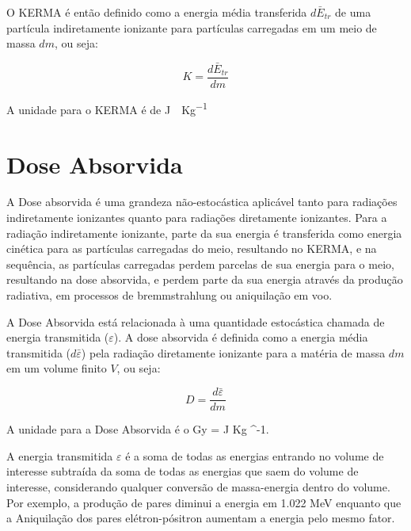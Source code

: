 \documentclass[11pt,a4paper]{article}
\newcounter{exemplo}
\begin{document}
		O KERMA é então definido como a energia média transferida $d\bar{E}_{tr}$ de uma partícula indiretamente ionizante para partículas carregadas em um meio de massa $dm$, ou seja:

			\begin{equation}
				K = \frac{d \bar{E}_{tr}}{d m}
			\end{equation}
		
		\begin{exemplo}[Unidade]
			A unidade para o KERMA é de \unit{J \cdot Kg^{-1}}
		\end{exemplo}
		


	\section{Dose Absorvida}

		A Dose absorvida é uma grandeza não-estocástica aplicável tanto para radiações indiretamente ionizantes quanto para radiações diretamente ionizantes. Para a radiação indiretamente ionizante, parte da sua energia é transferida como energia cinética para as partículas carregadas do meio, resultando no KERMA, e na sequência, as partículas carregadas perdem parcelas de sua energia para o meio, resultando na dose absorvida, e perdem parte da sua energia através da produção radiativa, em processos de bremmstrahlung ou aniquilação em voo. 
		
		
		A Dose  Absorvida está relacionada à uma quantidade estocástica chamada de energia transmitida ($\varepsilon$). A dose absorvida é definida como a energia média transmitida ($d\bar{\varepsilon}$) pela radiação diretamente ionizante para a matéria de massa $dm$ em um volume finito $V$, ou seja:


			\begin{equation}
				D = \frac{d \bar{\varepsilon}}{d m}
			\end{equation}

		\begin{exemplo}[Unidade]
			A unidade para a Dose Absorvida é o Gy = \unit{J \cdot Kg ^{-1}}.
		\end{exemplo}
		

		A energia transmitida $\varepsilon$ é a soma de todas as energias entrando no volume de interesse subtraída da soma de todas as energias que saem do volume de interesse, considerando qualquer conversão de massa-energia dentro do volume. Por exemplo, a produção de pares diminui a energia em 1.022 MeV enquanto que a Aniquilação dos pares elétron-pósitron aumentam a energia pelo mesmo fator. 
\end{document}
